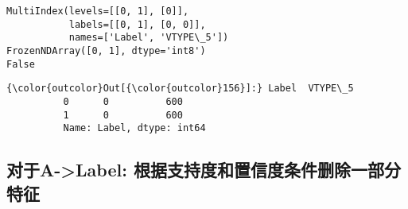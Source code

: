 \documentclass[11pt]{article}
\begin{document}
    \begin{Verbatim}[commandchars=\\\{\}]
MultiIndex(levels=[[0, 1], [0]],
           labels=[[0, 1], [0, 0]],
           names=['Label', 'VTYPE\_5'])
FrozenNDArray([0, 1], dtype='int8')
False

    \end{Verbatim}

\begin{Verbatim}[commandchars=\\\{\}]
{\color{outcolor}Out[{\color{outcolor}156}]:} Label  VTYPE\_5
          0      0          600
          1      0          600
          Name: Label, dtype: int64
\end{Verbatim}
            
    \hypertarget{ux5bf9ux4e8ea-label-ux6839ux636eux652fux6301ux5ea6ux548cux7f6eux4fe1ux5ea6ux6761ux4ef6ux5220ux9664ux4e00ux90e8ux5206ux7279ux5f81}{%
\subsection{对于A-\textgreater{}Label:
根据支持度和置信度条件删除一部分特征}\label{ux5bf9ux4e8ea-label-ux6839ux636eux652fux6301ux5ea6ux548cux7f6eux4fe1ux5ea6ux6761ux4ef6ux5220ux9664ux4e00ux90e8ux5206ux7279ux5f81}}
\end{document}
